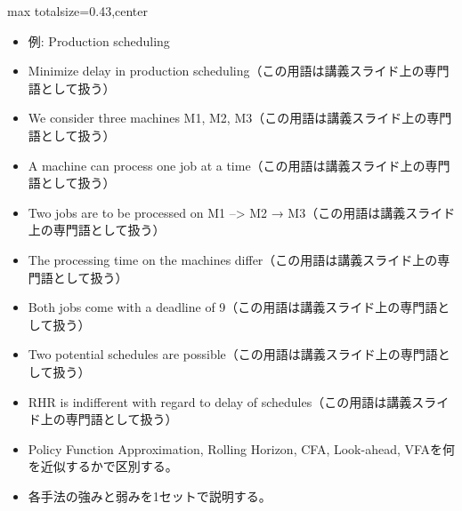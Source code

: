 \clearpage
{}
\begin{minipage}[t]{0.405\textwidth}
\begin{adjustbox}{max totalsize={\textwidth}{0.43\textheight},center}
\begin{minipage}{\textwidth}\scriptsize
{}\begin{itemize}
\item 例: Production scheduling
\item Minimize delay in production scheduling（この用語は講義スライド上の専門語として扱う）
\item We consider three machines M1, M2, M3（この用語は講義スライド上の専門語として扱う）
\item A machine can process one job at a time（この用語は講義スライド上の専門語として扱う）
\item Two jobs are to be processed on M1 –> M2 → M3（この用語は講義スライド上の専門語として扱う）
\item The processing time on the machines differ（この用語は講義スライド上の専門語として扱う）
\item Both jobs come with a deadline of 9（この用語は講義スライド上の専門語として扱う）
\item Two potential schedules are possible（この用語は講義スライド上の専門語として扱う）
\item RHR is indifferent with regard to delay of schedules（この用語は講義スライド上の専門語として扱う）
\end{itemize}\begin{itemize}
\item Policy Function Approximation, Rolling Horizon, CFA, Look-ahead, VFAを何を近似するかで区別する。
\item 各手法の強みと弱みを1セットで説明する。
\end{itemize}
\end{minipage}
\end{adjustbox}
\end{minipage}\hfill
